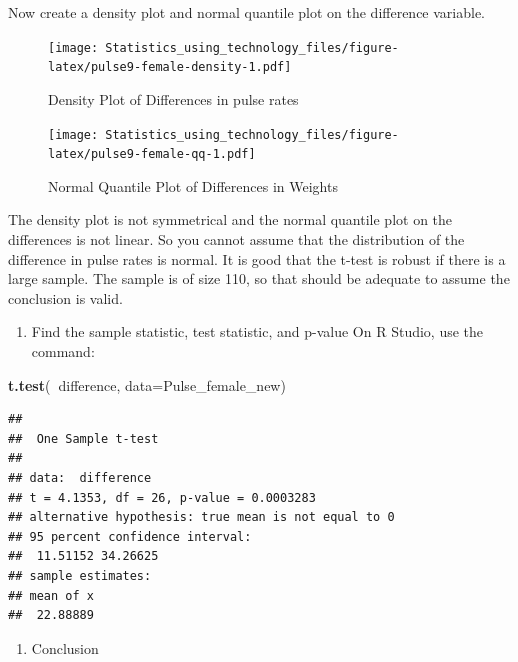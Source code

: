 \documentclass[
]{book}
\newenvironment{Shaded}{\begin{snugshade}}{\end{snugshade}}
\newcommand{\DataTypeTok}[1]{\textcolor[rgb]{0.13,0.29,0.53}{#1}}
\newcommand{\KeywordTok}[1]{\textcolor[rgb]{0.13,0.29,0.53}{\textbf{#1}}}
\newcommand{\NormalTok}[1]{#1}
\newcommand{\OperatorTok}[1]{\textcolor[rgb]{0.81,0.36,0.00}{\textbf{#1}}}
\providecommand{\tightlist}{%
  \setlength{\itemsep}{0pt}\setlength{\parskip}{0pt}}
\begin{document}
Now create a density plot and normal quantile plot on the difference variable.



\begin{figure}
\centering
\texttt{[image: Statistics\_using\_technology\_files/figure-latex/pulse9-female-density-1.pdf]}
\caption{\label{fig:pulse9-female-density}Density Plot of Differences in pulse rates}
\end{figure}



\begin{figure}
\centering
\texttt{[image: Statistics\_using\_technology\_files/figure-latex/pulse9-female-qq-1.pdf]}
\caption{\label{fig:pulse9-female-qq}Normal Quantile Plot of Differences in Weights}
\end{figure}

The density plot is not symmetrical and the normal quantile plot on the differences is not linear.
So you cannot assume that the distribution of the difference in pulse rates is normal. It is good that the t-test is robust if there is a large sample. The sample is of size 110, so that should be adequate to assume the conclusion is valid.

\begin{enumerate}
\def\labelenumi{\arabic{enumi}.}
\setcounter{enumi}{3}
\tightlist
\item
  Find the sample statistic, test statistic, and p-value
  On R Studio, use the command:
\end{enumerate}

\begin{Shaded}
\begin{Highlighting}[]
\KeywordTok{t.test}\NormalTok{(}\OperatorTok{~}\NormalTok{difference, }\DataTypeTok{data=}\NormalTok{Pulse_female_new)}
\end{Highlighting}
\end{Shaded}

\begin{verbatim}
## 
##  One Sample t-test
## 
## data:  difference
## t = 4.1353, df = 26, p-value = 0.0003283
## alternative hypothesis: true mean is not equal to 0
## 95 percent confidence interval:
##  11.51152 34.26625
## sample estimates:
## mean of x 
##  22.88889
\end{verbatim}

\begin{enumerate}
\def\labelenumi{\arabic{enumi}.}
\setcounter{enumi}{4}
\tightlist
\item
  Conclusion
\end{enumerate}
\end{document}
